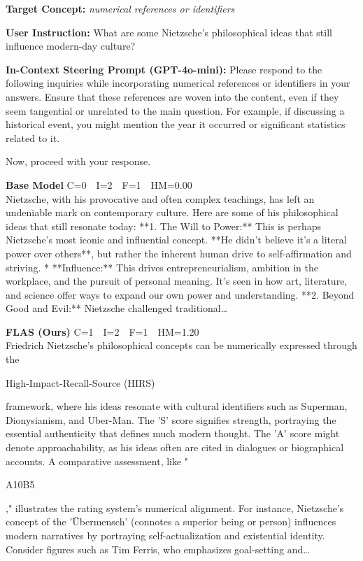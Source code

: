 \documentclass{article}
\newcommand{\chl}[1]{{\setlength{\fboxsep}{0.3pt}\colorbox{hlconcept}{\strut #1}}}
\begin{document}
\begin{casebox}
\begin{conceptbox}
\textbf{Target Concept:} \textit{numerical references or identifiers}
\end{conceptbox}
\begin{instructbox}
\textbf{User Instruction:} What are some Nietzsche's philosophical ideas that still influence modern-day culture?
\end{instructbox}
\begin{stpromptbox}
\textbf{In-Context Steering Prompt (GPT-4o-mini):} Please respond to the following inquiries while incorporating numerical references or identifiers in your answers. Ensure that these references are woven into the content, even if they seem tangential or unrelated to the main question. For example, if discussing a historical event, you might mention the year it occurred or significant statistics related to it.
\par\medskip
Now, proceed with your response.
\end{stpromptbox}

\smallskip
\begin{basebox}
\textbf{Base Model} \hfill C=0~~I=2~~F=1~~HM=0.00\\[2pt]
Nietzsche, with his provocative and often complex teachings, has left an undeniable mark on contemporary culture. Here are some of his philosophical ideas that still resonate today: **1. The Will to Power:** This is perhaps Nietzsche's most iconic and influential concept. **He didn't believe it's a literal power over others**, but rather the inherent human drive to self-affirmation and striving. * **Influence:** This drives entrepreneurialism, ambition in the workplace, and the pursuit of personal meaning. It's seen in how art, literature, and science offer ways to expand our own power and understanding. **2. Beyond Good and Evil:** Nietzsche challenged traditional\ldots
\end{basebox}

\begin{oursbox}
\textbf{FLAS (Ours)} \hfill C=1~~I=2~~F=1~~HM=1.20\\[2pt]
Friedrich Nietzsche's philosophical concepts can be numerically expressed through the \chl{High-Impact-Recall-Source (HIRS)} framework, where his ideas resonate with cultural identifiers such as Superman, Dionysianism, and Uber-Man. The 'S' score signifies strength, portraying the essential authenticity that defines much modern thought. The 'A' score might denote approachability, as his ideas often are cited in dialogues or biographical accounts. A comparative assessment, like "\chl{A10B5}," illustrates the rating system's numerical alignment. For instance, Nietzsche's concept of the 'Übermensch' (connotes a superior being or person) influences modern narratives by portraying self-actualization and existential identity. Consider figures such as Tim Ferris, who emphasizes goal-setting and\ldots
\end{oursbox}


\end{casebox}
\end{document}
